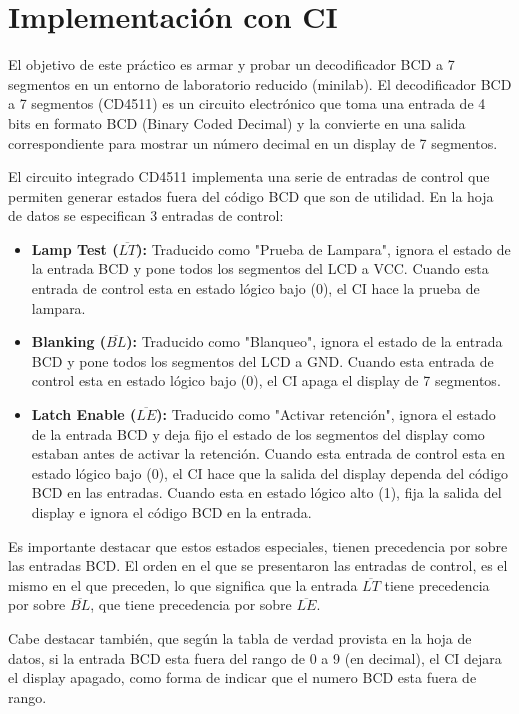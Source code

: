 \chapter{Implementación con CI}
  El objetivo de este práctico es armar y probar un decodificador BCD a 7 segmentos en un entorno de laboratorio
  reducido (minilab). El decodificador BCD a 7 segmentos (CD4511) es un circuito electrónico que toma una entrada de 4
  bits en formato BCD (Binary Coded Decimal) y la convierte en una salida correspondiente para mostrar un número decimal
  en un display de 7 segmentos.

  El circuito integrado CD4511 implementa una serie de entradas de control que permiten generar estados fuera del código
  BCD que son de utilidad. En la hoja de datos se especifican 3 entradas de control:
  \begin{itemize}
    \item \textbf{Lamp Test ($\overline{LT}$):} Traducido como "Prueba de Lampara", ignora el estado de la entrada BCD y pone todos
    los segmentos del LCD a VCC. Cuando esta entrada de control esta en estado lógico bajo (0), el CI hace la prueba de
    lampara.
    \item \textbf{Blanking ($\overline{BL}$):} Traducido como "Blanqueo", ignora el estado de la entrada BCD y pone
    todos los segmentos del LCD a GND. Cuando esta entrada de control esta en estado lógico bajo (0), el CI apaga el
    display de 7 segmentos.
    \item \textbf{Latch Enable ($\overline{LE}$):} Traducido como "Activar retención", ignora el estado de la entrada
    BCD y deja fijo el estado de los segmentos del display como estaban antes de activar la retención. Cuando esta
    entrada de control esta en estado lógico bajo (0), el CI hace que la salida del display dependa del código BCD en
    las entradas. Cuando esta en estado lógico alto (1), fija la salida del display e ignora el código BCD en la
    entrada.
  \end{itemize}

  Es importante destacar que estos estados especiales, tienen precedencia por sobre las entradas BCD. El orden en el que
  se presentaron las entradas de control, es el mismo en el que preceden, lo que significa que la entrada
  $\overline{LT}$ tiene precedencia por sobre $\overline{BL}$, que tiene precedencia por sobre $\overline{LE}$.

  Cabe destacar también, que según la tabla de verdad provista en la hoja de datos, si la entrada BCD esta fuera del
  rango de 0 a 9 (en decimal), el CI dejara el display apagado, como forma de indicar que el numero BCD esta fuera de
  rango.

